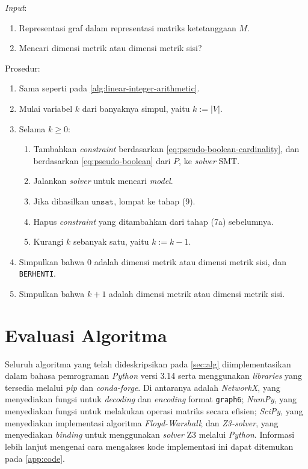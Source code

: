 \documentclass[10pt,twocolumn]{article}
\newcommand{\foreign}[1]{\foreignlanguage{english}{\textit{#1}}}
\def\unsat{\mathtt{unsat}}
\begin{document}
\begin{algorithm}[H]
	\foreign{Input}:
	\begin{enumerate}
		\item Representasi graf dalam representasi matriks ketetanggaan \(M\).
		\item Mencari dimensi metrik atau dimensi metrik sisi?
	\end{enumerate}
	Prosedur:
	\begin{enumerate}
		\item[1--5.] Sama seperti pada \autoref{alg:linear-integer-arithmetic}.
		\setcounter{enumi}{5}
		\item Mulai variabel \(k\) dari banyaknya simpul, yaitu \(k := |V|\).
		\item Selama \(k \geq 0\):
			\begin{enumerate}
					\item Tambahkan \foreign{constraint} berdasarkan \autoref{eq:pseudo-boolean-cardinality}, dan berdasarkan \autoref{eq:pseudo-boolean} dari \(P\), ke \foreign{solver} SMT.
					\item Jalankan \foreign{solver} untuk mencari \foreign{model}.
					\item Jika dihasilkan \(\unsat\), lompat ke tahap (9).
					\item Hapus \foreign{constraint} yang ditambahkan dari tahap (7a) sebelumnya.
					\item Kurangi \(k\) sebanyak satu, yaitu \(k := k - 1\).
			\end{enumerate}
		\item Simpulkan bahwa 0 adalah dimensi metrik atau dimensi metrik sisi, dan \texttt{BERHENTI}.
		\item Simpulkan bahwa \(k + 1\) adalah dimensi metrik atau dimensi metrik sisi.
	\end{enumerate}
	\caption{\foreign{Pseudo Boolean}}
	\label{alg:pseudo-boolean}
\end{algorithm}

\section{Evaluasi Algoritma}
\label{sec:implementation}

Seluruh algoritma yang telah dideskripsikan pada \autoref{sec:alg} diimplementasikan dalam bahasa pemrograman \foreign{Python} versi 3.14 serta menggunakan \foreign{libraries} yang tersedia melalui \foreign{pip} dan \foreign{conda-forge}. Di antaranya adalah \foreign{NetworkX}, yang menyediakan fungsi untuk \foreign{decoding} dan \foreign{encoding} format \verb`graph6`; \foreign{NumPy}, yang menyediakan fungsi untuk melakukan operasi matriks secara efisien; \foreign{SciPy}, yang menyediakan implementasi algoritma \foreign{Floyd-Warshall}; dan \foreign{Z3-solver}, yang menyediakan \foreign{binding} untuk menggunakan \foreign{solver} Z3 melalui \foreign{Python}. Informasi lebih lanjut mengenai cara mengakses kode implementasi ini dapat ditemukan pada \cref{app:code}.
\end{document}
